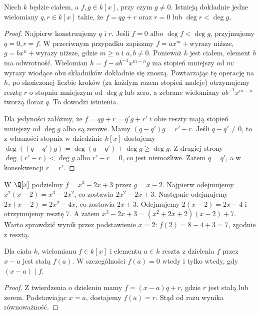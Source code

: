 \begin{twierdzenie}
\label{tw:dzielenie}
Niech $k$ będzie ciałem, a $f,g\in k[x]$, przy czym $g\ne0$.
Istnieją dokładnie jedne wielomiany $q,r\in k[x]$ takie, że
$f=qg+r$ oraz $r=0$ lub $\deg r<\deg g$.
\end{twierdzenie}
\begin{proof}
Najpierw konstruujemy $q$ i $r$.
Jeśli $f=0$ albo $\deg f<\deg g$, przyjmujemy $q=0,r=f$.
W przeciwnym przypadku zapiszmy
$f=ax^m+\text{wyrazy niższe}$,
$g=bx^n+\text{wyrazy niższe}$, gdzie $m\ge n$ i $a,b\ne0$.
Ponieważ $k$ jest ciałem, element $b$ ma odwrotność.
Wielomian $h=f-ab^{-1}x^{m-n}g$ ma stopień mniejszy od $m$:
wyrazy wiodące obu składników dokładnie się znoszą.
Powtarzając tę operację na $h$, po skończonej liczbie kroków
(za każdym razem stopień maleje) otrzymujemy resztę $r$ o stopniu
mniejszym od $\deg g$ lub zero, a zebrane wielomiany
$ab^{-1}x^{m-n}$ tworzą iloraz $q$. To dowodzi istnienia.

Dla jedyności załóżmy, że $f=qg+r=q'g+r'$ i obie reszty
mają stopień mniejszy od $\deg g$ albo są zerowe.
Mamy $(q-q')g=r'-r$. Jeśli $q-q'\ne0$, to z własności stopnia
w dziedzinie $k[x]$ dostajemy
$\deg((q-q')g)=\deg(q-q')+\deg g\ge\deg g$.
Z drugiej strony $\deg(r'-r)<\deg g$ albo $r'-r=0$,
co jest niemożliwe. Zatem $q=q'$, a w konsekwencji $r=r'$.
\end{proof}

\begin{przyklad}
W $\Q[x]$ podzielmy $f=x^3-2x+3$ przez $g=x-2$.
Najpierw odejmujemy $x^2(x-2)=x^3-2x^2$,
co zostawia $2x^2-2x+3$.
Następnie odejmujemy $2x(x-2)=2x^2-4x$,
co zostawia $2x+3$. Odejmujemy $2(x-2)=2x-4$
i otrzymujemy resztę $7$. A zatem
$x^3-2x+3=(x^2+2x+2)(x-2)+7$.
Warto sprawdzić wynik przez podstawienie $x=2$:
$f(2)=8-4+3=7$, zgodnie z resztą.
\end{przyklad}

\begin{wniosek}
Dla ciała $k$, wielomianu $f\in k[x]$ i elementu $a\in k$
reszta z dzielenia $f$ przez $x-a$ jest stałą $f(a)$.
W szczególności $f(a)=0$ wtedy i tylko wtedy, gdy $(x-a)\mid f$.
\end{wniosek}
\begin{proof}
Z twierdzenia o dzieleniu mamy $f=(x-a)q+r$,
gdzie $r$ jest stałą lub zerem. Podstawiając $x=a$,
dostajemy $f(a)=r$. Stąd od razu wynika równoważność.
\end{proof}

